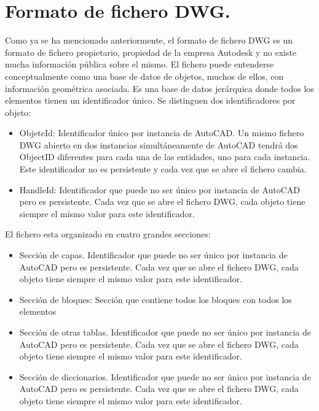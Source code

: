 \section{Formato de fichero DWG.}

Como ya se ha mencionado anteriormente, el formato de fichero DWG es un formato de fichero propietario, propiedad de la empresa Autodesk y no existe mucha información pública sobre el mismo. El fichero puede entenderse conceptualmente como una base de datos de objetos, muchos de ellos, con información geométrica asociada. Es una base de datos jerárquica donde todos los elementos tienen un identificador único. Se distinguen dos identificadores por objeto:

\begin{itemize}

\item{ObjetcId: Identificador único por instancia de AutoCAD. Un mismo fichero DWG abierto en dos instancias simultáneamente de AutoCAD tendrá dos ObjectID diferentes para cada una de las entidades, uno para cada instancia. Este identificador no es persistente y cada vez que se abre el fichero cambia.}

\item{HandleId: Identificador que puede no ser único por instancia de AutoCAD pero es persistente. Cada vez que se abre el fichero DWG, cada objeto tiene siempre el mismo valor para este identificador.}

\end{itemize}

El fichero esta organizado en cuatro grandes secciones:

\begin{itemize}

\item{Sección de capas. Identificador que puede no ser único por instancia de AutoCAD pero es persistente. Cada vez que se abre el fichero DWG, cada objeto tiene siempre el mismo valor para este identificador.}

\item{Sección de bloques: Sección que contiene todos los bloques con todos los elementos }


\item{Sección de otras tablas. Identificador que puede no ser único por instancia de AutoCAD pero es persistente. Cada vez que se abre el fichero DWG, cada objeto tiene siempre el mismo valor para este identificador.}

\item{Sección de diccionarios. Identificador que puede no ser único por instancia de AutoCAD pero es persistente. Cada vez que se abre el fichero DWG, cada objeto tiene siempre el mismo valor para este identificador.}

\end{itemize}

